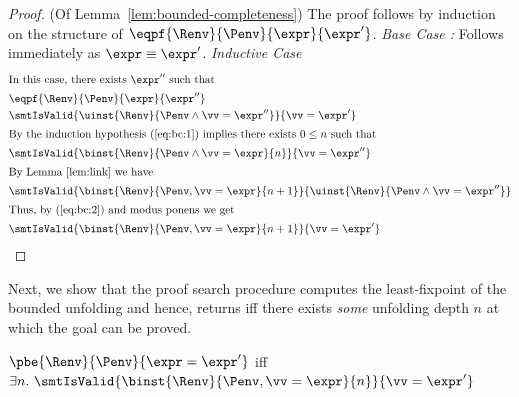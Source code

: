 \begin{proof} (Of Lemma~\ref{lem:bounded-completeness})
%
The proof follows by induction on the structure
of $\eqpf{\Renv}{\Penv}{\expr}{\expr'}$.
%
\smallskip \emph{Base Case :}
Follows immediately as $\expr \equiv \expr'$.
%
\smallskip \emph{Inductive Case }
\begin{align}
\intertext{In this case, there exists $\expr''$ such that}
  & \eqpf{\Renv}{\Penv}{\expr}{\expr''}
    \label{eq:bc:1} \\
  & \smtIsValid{\uinst{\Renv}{\Penv \wedge \vv = \expr''}}{\vv = \expr'}
    \label{eq:bc:2} \\
\intertext{By the induction hypothesis (\ref{eq:bc:1}) implies there exists $0 \leq n$ such that}
  & \smtIsValid{\binst{\Renv}{\Penv \wedge \vv = \expr}{n}}{\vv = \expr''}
    \notag \\
\intertext{By Lemma~\ref{lem:link} we have}
  & \smtIsValid{\binst{\Renv}{\Penv, \vv = \expr}{n+1}}{\uinst{\Renv}{\Penv \wedge \vv = \expr''}}
    \notag \\
\intertext{Thus, by (\ref{eq:bc:2}) and modus ponens we get}
  & \smtIsValid{\binst{\Renv}{\Penv, \vv = \expr}{n+1}}{\vv = \expr'} \notag
\end{align}
\end{proof}


%
Next, we show that the proof search procedure \pbesym computes
the least-fixpoint of the bounded unfolding and hence,
returns \ttrue iff there exists \emph{some} unfolding
depth $n$ at which the goal can be proved.

\begin{lemma}\label{lem:fixpoint}
$\pbe{\Renv}{\Penv}{\expr = \expr'}$ iff
$\exists n.\ \smtIsValid{\binst{\Renv}{\Penv, \vv = \expr}{n}}{\vv = \expr'}$
\end{lemma}

